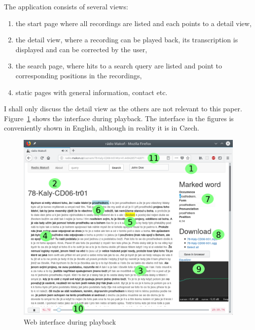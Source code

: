 \documentclass[hidelinks,12pt,a4paper]{report}
\begin{document}
The application consists of several views:
\begin{enumerate}
\item{the start page where all recordings are listed and each points to a detail
view,}
\item{the detail view, where a recording can be played back, its transcription
is displayed and can be corrected by the user,}
\item{the search page, where hits to a search query are listed and point to
corresponding positions in the recordings,}
\item{static pages with general information, contact etc.}
\end{enumerate}

I shall only discuss the detail view as the others are not relevant to this
paper. Figure~\ref{fig:scn1lab} shows the interface during playback.
The interface in the figures is conveniently shown in English, although in
reality it is in Czech.

\begin{figure}[htpb]
\includegraphics[scale=0.6]{rc/radio-makon-en-1-lab.png}
\caption{Web interface during playback}
\label{fig:scn1lab}
\end{figure}
\end{document}
